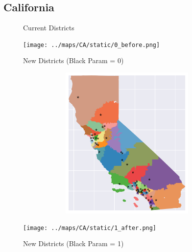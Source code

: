 \subsection{California}
\begin{figure}[htb!] \centering
\caption{ Current Districts }
\texttt{[image: ../maps/CA/static/0\_before.png]}
\caption{ New Districts (Black Param = 0) }
\includegraphics[width=5in,height=3in,keepaspectratio]{../maps/CA/static/0_after.png}
\caption{ New Districts (Black Param = 1) }
\texttt{[image: ../maps/CA/static/1\_after.png]}
\end{figure}

\clearpage
\newpage


